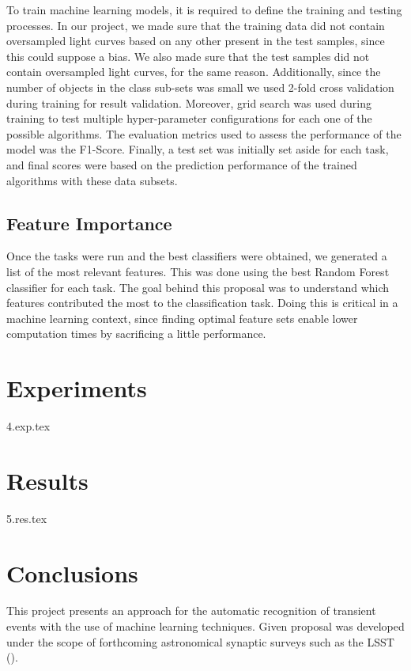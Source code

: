 \documentclass[a4paper,fleqn,usenatbib]{mnras}
\begin{document}
To train machine learning models, it is required to define the training and testing processes. In our project, we made sure that the training data did not contain oversampled light curves based on any other present in the test samples, since this could suppose a bias. We also made sure that the test samples did not contain oversampled light curves, for the same reason. Additionally, since the number of objects in the class sub-sets was small we used 2-fold cross validation during training for result validation. Moreover, grid search was used during training to test multiple hyper-parameter configurations for each one of the possible algorithms. The evaluation metrics used to assess the performance of the model was the F1-Score. Finally, a test set was initially set aside for each task, and final scores were based on the prediction performance of the trained algorithms with these data subsets.


\subsection{Feature Importance} \label{subsection_importances}

Once the tasks were run and the best classifiers were obtained, we generated a list of the most relevant features. This was done using the best Random Forest classifier for each task. The goal behind this proposal was to understand which features contributed the most to the classification task. Doing this is critical in a machine learning context, since finding optimal feature sets enable lower computation times by sacrificing a little performance.

\section{Experiments} \label{section_experimentation}
{4.exp.tex}

\section{Results} \label{section_results}
{5.res.tex} 

\section{Conclusions}

This project presents an approach for the automatic recognition of transient events with the use of machine learning techniques. Given proposal was developed under the scope of forthcoming astronomical synaptic surveys such as the LSST (\cite{0805.2366}). 
\end{document}
